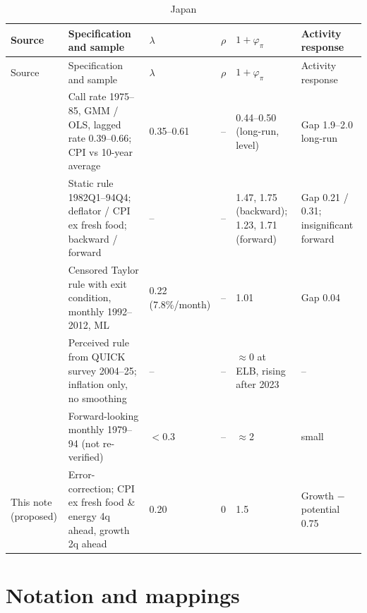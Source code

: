 \documentclass[11pt,a4paper]{article}
\begin{document}
\begin{footnotesize}
\begin{longtable}{@{}L{28mm}L{44mm}L{12mm}L{8mm}L{18mm}L{28mm}@{}}
\caption{Japan}\\
\toprule
Source & Specification and sample & $\lambda$ & $\rho$ & $1+\varphi_\pi$ & Activity response \\
\midrule
\endfirsthead
\toprule
Source & Specification and sample & $\lambda$ & $\rho$ & $1+\varphi_\pi$ & Activity response \\
\midrule
\endhead
\bottomrule
\endfoot
\textcite{jinushi2000} & Call rate 1975--85, GMM / OLS, lagged rate 0.39--0.66; CPI vs 10-year average & 0.35--0.61 & -- & 0.44--0.50 (long-run, level) & Gap 1.9--2.0 long-run \\
\textcite{itomishkin2004} & Static rule 1982Q1--94Q4; deflator / CPI ex fresh food; backward / forward & -- & -- & 1.47, 1.75 (backward); 1.23, 1.71 (forward) & Gap 0.21 / 0.31; insignificant forward \\
\textcite{hayashikoeda2019} & Censored Taylor rule with exit condition, monthly 1992--2012, ML & 0.22 (7.8\%/month) & -- & 1.01 & Gap 0.04 \\
\textcite{haba2026} & Perceived rule from QUICK survey 2004--25; inflation only, no smoothing & -- & -- & $\approx$0 at ELB, rising after 2023 & -- \\
\textcite{cgg1998} & Forward-looking monthly 1979--94 (not re-verified) & $<$0.3 & -- & $\approx$2 & small \\
This note (proposed) & Error-correction; CPI ex fresh food \& energy 4q ahead, growth 2q ahead & 0.20 & 0 & 1.5 & Growth $-$ potential 0.75 \\
\end{longtable}
\end{footnotesize}

\section{Notation and mappings}
\end{document}
